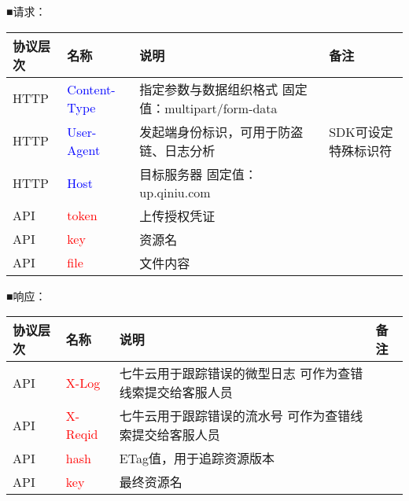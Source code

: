 \documentclass[11pt, oneside]{book}
\newcommand{\qblock}[1]{
\vspace{0.1em}
\noindent
#1\par
\vspace{0.1em}
}
\newcommand{\qtable}[1]{\footnotesize\vspace{0.5em}#1\vspace{0.5em}\normalsize}
\begin{document}
\clearpage

\qblock{■\thinspace 请求：}
\qtable{
\def\arraystretch{2}
\begin{tabular}{|l|p{7em}|p{19em}|p{7em}|}
\hline
协议层次 & 名称 & 说明 & 备注 \\
\hline
HTTP & \textcolor{blue}{Content-Type} & 指定参数与数据组织格式 \newline 固定值：multipart/form-data & \\
\hline
HTTP & \textcolor{blue}{User-Agent} & 发起端身份标识，可用于防盗链、日志分析 & SDK可设定特殊标识符 \\
\hline
HTTP & \textcolor{blue}{Host} & 目标服务器 \newline 固定值：up.qiniu.com & \\
\hline
API & \textcolor{red}{token} & 上传授权凭证 & \\
\hline
API & \textcolor{red}{key} & 资源名 & \\
\hline
API & \textcolor{red}{file} & 文件内容 & \\
\hline
\end{tabular}
}

\qblock{■\thinspace 响应：}
\qtable{
\def\arraystretch{2}
\begin{tabular}{|l|p{7em}|p{19em}|p{7em}|}
\hline
协议层次 & 名称 & 说明 & 备注 \\
\hline
API & \textcolor{red}{X-Log} & 七牛云用于跟踪错误的微型日志 \newline 可作为查错线索提交给客服人员 & \\
\hline
API & \textcolor{red}{X-Reqid} & 七牛云用于跟踪错误的流水号 \newline 可作为查错线索提交给客服人员 & \\
\hline
API & \textcolor{red}{hash} & ETag值，用于追踪资源版本 & \\
\hline
API & \textcolor{red}{key} & 最终资源名 & \\
\hline
\end{tabular}
}
\end{document}
